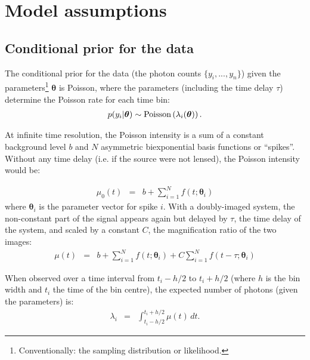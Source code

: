 \documentclass[a4paper, 11pt]{article}
\title{}
\author{}
\date{\today}
\begin{document}
\maketitle


\section{Model assumptions}

\subsection{Conditional prior for the data}
The conditional prior for the data (the photon counts $\{y_i, ..., y_n\}$)
given the parameters\footnote{Conventionally:
the sampling distribution or likelihood.} $\boldsymbol{\theta}$ is Poisson,
where the parameters (including the time delay $\tau$)
determine the Poisson rate for each time bin:
\begin{eqnarray}
p(y_i | \boldsymbol{\theta}) \sim \textnormal{Poisson}
\left(
\lambda_i(\boldsymbol{\theta})
\right).
\end{eqnarray}

At infinite time resolution, the Poisson intensity is a sum of a constant
background level $b$ and $N$ asymmetric biexponential basis functions or
``spikes''. Without any time delay (i.e. if the source were not lensed),
the Poisson intensity would be:

\begin{eqnarray}
\mu_0(t) &=& b + \sum_{i=1}^N f(t; \boldsymbol{\theta}_i)
\end{eqnarray}
where $\boldsymbol{\theta}_i$ is the parameter vector for spike $i$.
With a doubly-imaged system, the non-constant part of the signal appears
again but delayed by $\tau$, the time delay of the system, and scaled by
a constant $C$, the magnification ratio of the two images:
\begin{eqnarray}
\mu(t) &=& b + \sum_{i=1}^N f(t; \boldsymbol{\theta}_i) +
C\sum_{i=1}^N f(t - \tau; \boldsymbol{\theta}_i)
\end{eqnarray}

When observed over a time interval from $t_i - h/2$ to $t_i + h/2$ (where
$h$ is the bin width and $t_i$ the time of the bin centre), the expected
number of photons (given the parameters) is:
\begin{eqnarray}
\lambda_i &=& \int_{t_i - h/2}^{t_i + h/2} \mu(t) \, dt.\label{eq:bin_integral}
\end{eqnarray}
\end{document}
